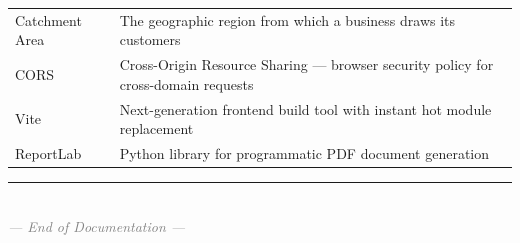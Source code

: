\documentclass[12pt, a4paper]{article}
\begin{document}
\begin{longtable}{@{} p{4cm} p{12cm} @{}}
    Catchment Area    & The geographic region from which a business draws its customers \\[4pt]
    CORS              & Cross-Origin Resource Sharing — browser security policy for cross-domain requests \\[4pt]
    Vite              & Next-generation frontend build tool with instant hot module replacement \\[4pt]
    ReportLab         & Python library for programmatic PDF document generation \\[4pt]
    \bottomrule
\end{longtable}

\vfill
\begin{center}
    \textcolor{gray}{\rule{5cm}{0.4pt}}\\[6pt]
    \textcolor{gray}{\textit{— End of Documentation —}}
\end{center}
\end{document}
